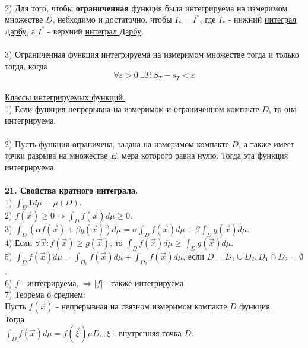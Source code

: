 \documentclass[12pt]{article}
\begin{document}
\\
2) Для того, чтобы \textbf{ограниченная} функция была интегрируема на измеримом множестве $D$, небходимо и достаточно, чтобы $I_{*} = I^{*}$, где $I_{*}$ - нижний \hyperref[darbouxInt]{интеграл Дарбу}, а $I^{*}$ - верхний \hyperref[darbouxInt]{интеграл Дарбу}.\\
\\
3) Ограниченная функция интегрируема на измеримом множестве тогда и только тогда, когда\\
$$\forall \varepsilon > 0 \ \exists T : S_T - s_T < \varepsilon$$
\\
\label{question20_4}\uline{Классы интегрируемых функций.}\\
1) Если функция непрерывна на измеримом и ограниченном компакте $D$, то она интегрируема.\\
\\
2) Пусть функция ограничена, задана на измеримом компакте $D$, а также имеет точки разрыва на множестве $E$, мера которого равна нулю. Тогда эта функция интегрируема.\\
\\
\label{question21}\textbf{21. Свойства кратного интеграла.}\\
1) $\int_D 1d\mu = \mu(D)$.\\
2) $f(\overrightarrow{x}) \geq 0 \Rightarrow \int_D f(\overrightarrow{x})d\mu \geq 0$.\\
3) $\int_D(\alpha f(\overrightarrow{x})+\beta g(\overrightarrow{x}))d\mu = \alpha\int_D f(\overrightarrow{x})d\mu + \beta\int_D g(\overrightarrow{x})d\mu$.\\
4) Если $\forall \overrightarrow{x} : f(\overrightarrow{x}) \geq g(\overrightarrow{x})$, то $\int_D f(\overrightarrow{x})d\mu \geq \int_D g(\overrightarrow{x})d\mu$.\\
5) $\int_D f(\overrightarrow{x})d\mu = \int_{D_1} f(\overrightarrow{x})d\mu + \int_{D_2} f(\overrightarrow{x})d\mu$, если $D = D_1 \cup D_2, D_1 \cap D_2 = \emptyset$.\\
6) $f$ - интегрируема, $\Rightarrow |f|$ - также интегрируема.\\
7) Теорема о среднем:\\
Пусть $f(\overrightarrow{x})$ - непрерывная на связном измеримом компакте $D$ функция.\\
Тогда\\
$\int_D f(\overrightarrow{x}) d\mu = f(\overrightarrow{\xi})\mu D, , \xi$ - внутренняя точка $D$.\\
\\
\end{document}
